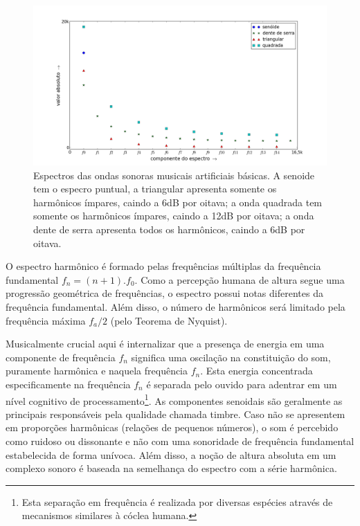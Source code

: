 \begin{figure}[h!]
    \centering
        \includegraphics[width=\textwidth]{figuras/espectroDeOndas6}
    \caption{Espectros das ondas sonoras musicais artificiais básicas. A senoide tem o especro puntual, a triangular apresenta somente os harmônicos ímpares, caindo a 6dB por oitava; a onda quadrada tem somente os harmônicos ímpares, caindo a 12dB por oitava; a onda dente de serra apresenta todos os harmônicos, caindo a 6dB por oitava.}
        \label{fig:espectroDeOndas}
\end{figure}


O espectro harmônico é formado pelas frequências múltiplas da frequência fundamental $f_n=(n+1).f_0$.
Como a percepção humana de altura segue uma progressão geométrica de frequências, o espectro possui notas diferentes da frequência fundamental. Além disso, o número de harmônicos será limitado pela frequência máxima $f_a/2$ (pelo Teorema de Nyquist). 

Musicalmente crucial aqui é internalizar que a presença de
energia
em uma componente de frequência $f_n$ significa
 uma oscilação na constituição do som, puramente harmônica e naquela frequência $f_n$. Esta energia concentrada especificamente na frequência $f_n$ é separada
 pelo ouvido para adentrar em um nível cognitivo de processamento\footnote{Esta separação em frequência é realizada por diversas espécies através de mecanismos similares à cóclea humana.\cite{Roederer}}.
  As componentes senoidais são geralmente as principais responsáveis pela qualidade chamada timbre. Caso não se apresentem em proporções harmônicas (relações de pequenos números), o som é percebido como ruidoso ou dissonante e não com uma sonoridade de frequência fundamental estabelecida de forma unívoca. Além disso, a noção de altura absoluta em um complexo sonoro é baseada na semelhança do espectro com a série harmônica.\cite{Roederer}


